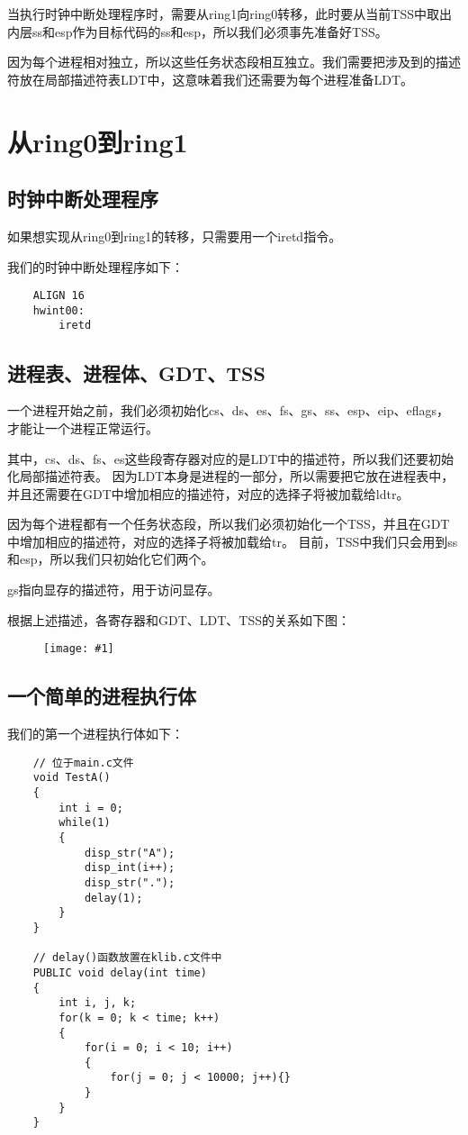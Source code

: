 \documentclass[a4paper,left=2.5cm,right=2.5cm,11pt]{report}
\newcommand{\fic}[1]{\begin{figure}[H]
		\center
		\texttt{[image: \#1]}
	\end{figure}}
\begin{document}
	当执行时钟中断处理程序时，需要从ring1向ring0转移，此时要从当前TSS中取出内层ss和esp作为目标代码的ss和esp，所以我们必须事先准备好TSS。\par

	因为每个进程相对独立，所以这些任务状态段相互独立。我们需要把涉及到的描述符放在局部描述符表LDT中，这意味着我们还需要为每个进程准备LDT。

\section{从ring0到ring1}
\subsection{时钟中断处理程序}
	如果想实现从ring0到ring1的转移，只需要用一个iretd指令。\par

	我们的时钟中断处理程序如下：
	\begin{lstlisting}
	ALIGN 16
	hwint00:
		iretd
	\end{lstlisting}

\subsection{进程表、进程体、GDT、TSS}
	一个进程开始之前，我们必须初始化cs、ds、es、fs、gs、ss、esp、eip、eflags，才能让一个进程正常运行。\par

	其中，cs、ds、fs、es这些段寄存器对应的是LDT中的描述符，所以我们还要初始化局部描述符表。
	因为LDT本身是进程的一部分，所以需要把它放在进程表中，并且还需要在GDT中增加相应的描述符，对应的选择子将被加载给ldtr。\par

	因为每个进程都有一个任务状态段，所以我们必须初始化一个TSS，并且在GDT中增加相应的描述符，对应的选择子将被加载给tr。
	目前，TSS中我们只会用到ss和esp，所以我们只初始化它们两个。\par

	gs指向显存的描述符，用于访问显存。\par

	根据上述描述，各寄存器和GDT、LDT、TSS的关系如下图：
	\fic{2.png}
	
\subsection{一个简单的进程执行体}
	我们的第一个进程执行体如下：
	\begin{lstlisting}
	// 位于main.c文件
	void TestA()
	{
		int i = 0;
		while(1)
		{
			disp_str("A");
			disp_int(i++);
			disp_str(".");
			delay(1);
		}
	}

	// delay()函数放置在klib.c文件中
	PUBLIC void delay(int time)
	{
		int i, j, k;
		for(k = 0; k < time; k++)
		{
			for(i = 0; i < 10; i++)
			{
				for(j = 0; j < 10000; j++){}
			}
		}
	}
	\end{lstlisting}
\end{document}
